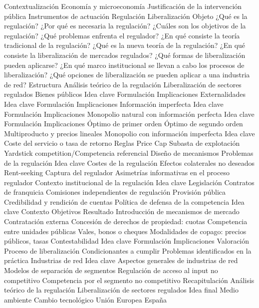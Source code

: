 \documentclass{nuevotema}
\begin{document}
\begin{esquema}[enumerate]
	\1[] 
		\2 Contextualización
			\3 Economía y microeconomía
			\3 Justificación de la intervención pública
			\3 Instrumentos de actuación
			\3 Regulación
			\3 Liberalización
		\2 Objeto
			\3 ¿Qué es la regulación?
			\3 ¿Por qué es necesaria la regulación?
			\3 ¿Cuáles son los objetivos de la regulación?
			\3 ¿Qué problemas enfrenta el regulador?
			\3 ¿En qué consiste la teoría tradicional de la regulación?
			\3 ¿Qué es la nueva teoría de la regulación?
			\3 ¿En qué consiste la liberalización de mercados regulados?
			\3 ¿Qué formas de liberalización pueden aplicarse?
			\3 ¿En qué marco institucional se llevan a cabo los procesos de liberalización?
			\3 ¿Qué opciones de liberalización se pueden aplicar a una industria de red?
		\2 Estructura
			\3 Análisis teórico de la regulación
			\3 Liberalización de sectores regulados
	\1 
		\2 Bienes públicos
			\3 Idea clave
			\3 Formulación
			\3 Implicaciones
		\2 Externalidades
			\3 Idea clave
			\3 Formulación
			\3 Implicaciones
		\2 Información imperfecta
			\3 Idea clave
			\3 Formulación
			\3 Implicaciones
		\2 Monopolio natural con información perfecta
			\3 Idea clave
			\3 Formulación
			\3 Implicaciones
			\3 Óptimo de primer orden
			\3 Óptimo de segundo orden
			\3 Multiproducto y precios lineales
		\2 Monopolio con información imperfecta
			\3 Idea clave
			\3 Coste del servicio o tasa de retorno
			\3 Reglas Price Cap
			\3 Subasta de explotación
			\3 Yardstick competition/Competencia referencial
			\3 Diseño de mecanismos
		\2 Problemas de la regulación
			\3 Idea clave
			\3 Costes de la regulación
			\3 Efectos colaterales no deseados
			\3 Rent-seeking
			\3 Captura del regulador
			\3 Asimetrías informativas en el proceso regulador
		\2 Contexto institucional de la regulación
			\3 Idea clave
			\3 Legislación
			\3 Contratos de franquicia
			\3 Comisiones independientes de regulación
			\3 Provisión pública
			\3 Credibilidad y rendición de cuentas
			\3 Política de defensa de la competencia
	\1 
		\2 Idea clave
			\3 Contexto
			\3 Objetivos
			\3 Resultado
		\2 Introducción de mecanismos de mercado
			\3 Contratación externa
			\3 Concesión de derechos de propiedad: cuotas
			\3 Competencia entre unidades públicas
			\3 Vales, bonos o cheques
			\3 Modalidades de copago: precios públicos, tasas
		\2 Contestabilidad
			\3 Idea clave
			\3 Formulación
			\3 Implicaciones
			\3 Valoración
		\2 Proceso de liberalización
			\3 Condicionantes a cumplir
			\3 Problemas identificados en la práctica
		\2 Industrias de red
			\3 Idea clave
			\3 Aspectos generales de industrias de red
			\3 Modelos de separación de segmentos
			\3 Regulación de acceso al input no competitivo
			\3 Competencia por el segmento no competitivo
	\1[] 
		\2 Recapitulación
			\3 Análisis teórico de la regulación
			\3 Liberalización de sectores regulados
		\2 Idea final
			\3 Medio ambiente
			\3 Cambio tecnológico
			\3 Unión Europea
			\3 España

\end{esquema}
\end{document}
